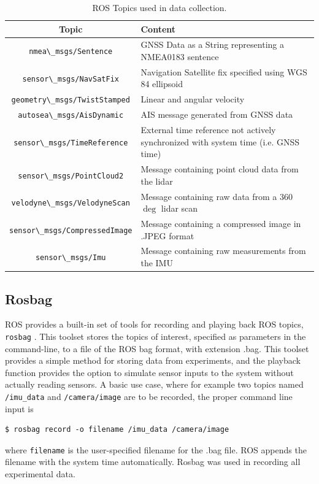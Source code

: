 \begin{table}[H]
	\centering
	\begin{tabularx}{\linewidth}{|c|L|}\hline
		\textbf{Topic} & \textbf{Content} \\\hline
		\lstinline[basicstyle=\ttfamily]{nmea\_msgs/Sentence} & GNSS Data as a String representing a NMEA0183 sentence \\\hline
		\lstinline[basicstyle=\ttfamily]{sensor\_msgs/NavSatFix} & Navigation Satellite fix specified using WGS 84 ellipsoid\\\hline
		\lstinline[basicstyle=\ttfamily]{geometry\_msgs/TwistStamped} & Linear and angular velocity\\\hline
		\lstinline[basicstyle=\ttfamily]{autosea\_msgs/AisDynamic} & AIS message generated from GNSS data\\\hline
		\lstinline[basicstyle=\ttfamily]{sensor\_msgs/TimeReference} & External time reference not actively synchronized with system time (i.e. GNSS time) \\\hline
		\lstinline[basicstyle=\ttfamily]{sensor\_msgs/PointCloud2} & Message containing point cloud data from the lidar \\\hline
		\lstinline[basicstyle=\ttfamily]{velodyne\_msgs/VelodyneScan} & Message containing raw data from a 360$\deg$ lidar scan \\\hline
		\lstinline[basicstyle=\ttfamily]{sensor\_msgs/CompressedImage} & Message containing a compressed image in .JPEG format\\\hline
		\lstinline[basicstyle=\ttfamily]{sensor\_msgs/Imu} & Message containing raw measurements from the IMU\\\hline
		\end{tabularx}
	\caption{ROS Topics used in data collection.}
	\label{tab:topics}
\end{table}
\subsection{Rosbag}
ROS provides a built-in set of tools for recording and playing back ROS topics, \lstinline[basicstyle=\ttfamily]{rosbag} \cite{rosbag}. This toolset stores the topics of interest, specified as parameters in the command-line, to a file of the ROS bag format, with extension .bag. This toolset provides a simple method for storing data from experiments, and the playback function provides the option to simulate sensor inputs to the system without actually reading sensors. A basic use case, where for example two topics named \lstinline[basicstyle=\ttfamily]{/imu_data} and \lstinline[basicstyle=\ttfamily]{/camera/image} are to be recorded, the proper command line input is 
\begin{lstlisting}[basicstyle=\ttfamily]
	$ rosbag record -o filename /imu_data /camera/image
\end{lstlisting}
where \lstinline[basicstyle=\ttfamily]{filename} is the user-specified filename for the .bag file. ROS appends the filename with the system time automatically. Rosbag was used in recording all experimental data.
